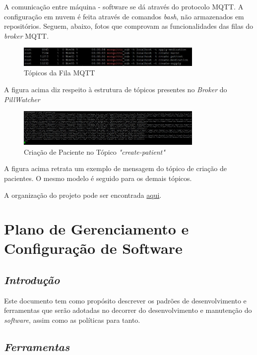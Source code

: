 \begin{apendicesenv}
A comunicação entre máquina - software se dá através do protocolo MQTT. A configuração em nuvem é feita através de comandos \textit{bash}, não armazenados em repositórios. Seguem, abaixo, fotos que comprovam as funcionalidades das filas do \textit{broker} MQTT.

\begin{figure}[H]
    \centering
    \includegraphics[width=0.8\textwidth]{figuras/software/mqtt/FilasBroker.JPG}
    \caption{Tópicos da Fila MQTT}
    \label{fig:filas_broker}
\end{figure}

A figura acima diz respeito à estrutura de tópicos presentes no \textit{Broker} do \textit{PillWatcher}

\begin{figure}[H]
    \centering
    \includegraphics[width=0.8\textwidth]{figuras/software/mqtt/CriacaoPatient.JPG}
    \caption{Criação de Paciente no Tópico \textit{"create-patient"}}
    \label{fig:criacao_patient_mqtt}
\end{figure}

A figura acima retrata um exemplo de mensagem do tópico de criação de pacientes. O mesmo modelo é seguido para os demais tópicos.


A organização do projeto pode ser encontrada \href{https://github.com/PillWatcher}{aqui}.

\chapter{Plano de Gerenciamento e
Configuração de Software}

\section{\textit{Introdução}}
Este documento tem como propósito descrever os padrões de desenvolvimento e
ferramentas que serão adotadas no decorrer do desenvolvimento e manutenção do \textit{software},
assim como as políticas para tanto.

\section{\textit{Ferramentas}}


\end{apendicesenv}

